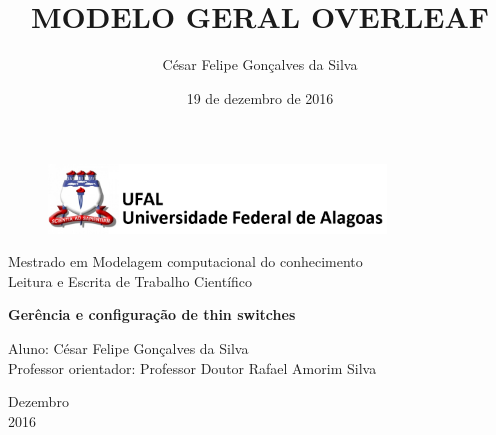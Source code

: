 \documentclass[12pt, a4paper]{article}
\title{MODELO GERAL OVERLEAF} %
\author{César Felipe Gonçalves da Silva}
\date{19 de dezembro de 2016}
\begin{document}


\begin{titlepage}
\begin{center}
	
\begin{figure}[!ht]
\centering
\includegraphics[width=0.8\textwidth]{logo-ufal.png} 
\end{figure}

\large{Mestrado em Modelagem computacional do conhecimento}\\ 

\large{Leitura e Escrita de Trabalho Científico}\\ 

\vspace{110pt}
        
\textbf{\LARGE{Gerência e configuração de thin switches}}\\

\vspace{3,5cm}
\end{center}
	
\begin{flushleft}
Aluno: César Felipe Gonçalves da Silva\\
Professor orientador: Professor Doutor Rafael Amorim Silva \\
\end{flushleft}

	
\begin{center}
\vspace{\fill}
Dezembro\\
2016

\end{center}
\end{titlepage}


\end{document}
